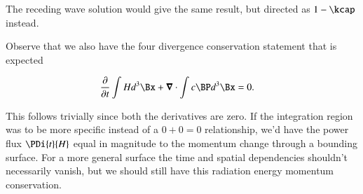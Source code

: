 The receding wave solution would give the same result, but directed as $1 - \kcap$ instead.

Observe that we also have the four divergence conservation statement that is expected

\begin{align}\label{eqn:ftMaxVacuum:82}
\PD{t}{} \int H d^3 \Bx + \spacegrad \cdot \int c \BP d^3 \Bx &= 0.
\end{align}

This follows trivially since both the derivatives are zero.  If the integration region was to be more specific instead of a $0 + 0 = 0$ relationship, we'd have the power flux $\PDi{t}{H}$ equal in magnitude to the momentum change through a bounding surface.  For a more general surface the time and spatial dependencies shouldn't necessarily vanish, but we should still have this radiation energy momentum conservation.


\EndArticle
